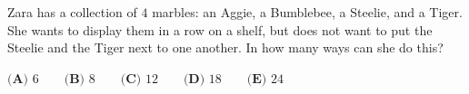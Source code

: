 Zara has a collection of $4$ marbles: an Aggie, a Bumblebee, a Steelie, and a Tiger. She wants to display them in a row on a shelf, but does not want to put the Steelie and the Tiger next to one another. In how many ways can she do this?

$\textbf{(A) }6 \qquad \textbf{(B) }8 \qquad \textbf{(C) }12 \qquad \textbf{(D) }18 \qquad \textbf{(E) }24$
